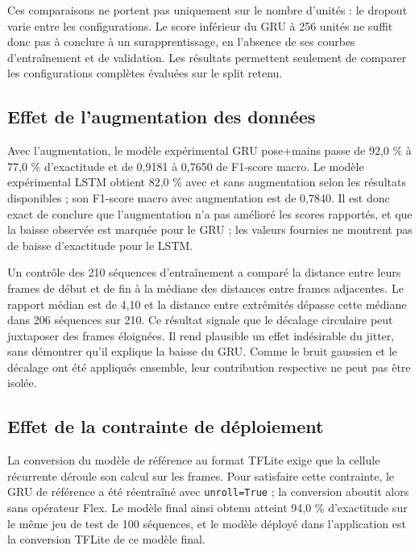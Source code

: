 Ces comparaisons ne portent pas uniquement sur le nombre d'unités : le dropout varie entre les configurations. Le score inférieur du GRU à 256 unités ne suffit donc pas à conclure à un surapprentissage, en l'absence de ses courbes d'entraînement et de validation. Les résultats permettent seulement de comparer les configurations complètes évaluées sur le split retenu.

\subsection{Effet de l'augmentation des données}

Avec l'augmentation, le modèle expérimental GRU pose+mains passe de 92,0 \% à 77,0 \% d'exactitude et de 0,9181 à 0,7650 de F1-score macro. Le modèle expérimental LSTM obtient 82,0 \% avec et sans augmentation selon les résultats disponibles ; son F1-score macro avec augmentation est de 0,7840. Il est donc exact de conclure que l'augmentation n'a pas amélioré les scores rapportés, et que la baisse observée est marquée pour le GRU ; les valeurs fournies ne montrent pas de baisse d'exactitude pour le LSTM.

Un contrôle des 210 séquences d'entraînement a comparé la distance entre leurs frames de début et de fin à la médiane des distances entre frames adjacentes. Le rapport médian est de 4,10 et la distance entre extrémités dépasse cette médiane dans 206 séquences sur 210. Ce résultat signale que le décalage circulaire peut juxtaposer des frames éloignées. Il rend plausible un effet indésirable du jitter, sans démontrer qu'il explique la baisse du GRU. Comme le bruit gaussien et le décalage ont été appliqués ensemble, leur contribution respective ne peut pas être isolée.

\subsection{Effet de la contrainte de déploiement}
\label{sec:deploiement-tflite}

La conversion du modèle de référence au format TFLite exige que la cellule récurrente déroule son calcul sur les frames. Pour satisfaire cette contrainte, le GRU de référence a été réentraîné avec \texttt{unroll=True} ; la conversion aboutit alors sans opérateur Flex. Le modèle final ainsi obtenu atteint 94,0 \% d'exactitude sur le même jeu de test de 100 séquences, et le modèle déployé dans l'application est la conversion TFLite de ce modèle final.

